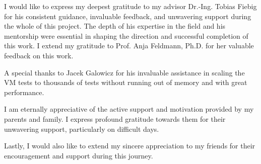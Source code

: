 
I would like to express my deepest gratitude to my advisor Dr.-Ing. Tobias Fiebig for his consistent guidance, invaluable feedback, and unwavering support during the whole of this project.
The depth of his expertise in the field and his mentorship were essential in shaping the direction and successful completion of this work.
I extend my gratitude to Prof. Anja Feldmann, Ph.D. for her valuable feedback on this work.

A special thanks to Jacek Galowicz for his invaluable assistance in scaling the VM tests to thousands of tests without running out of memory and with great performance.

I am eternally appreciative of the active support and motivation provided by my parents and family.
I express profound gratitude towards them for their unwavering support, particularly on difficult days.

Lastly, I would also like to extend my sincere appreciation to my friends for their encouragement and support during this journey.


